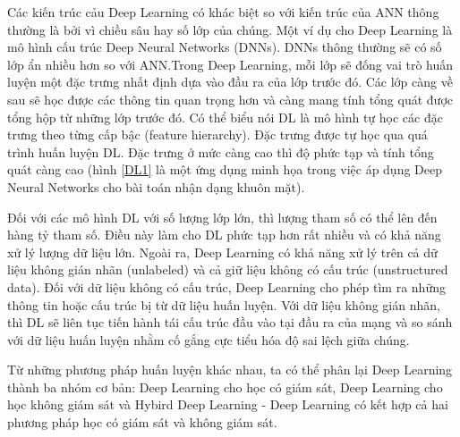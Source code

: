	Các kiến trúc cảu Deep Learning có khác biệt so với kiến trúc của ANN thông thường là bởi vì chiều sâu hay số lớp của chúng. Một ví dụ cho Deep Learning là mô hình cấu trúc Deep Neural Networks (DNNs). DNNs thông thường sẽ có số lớp ẩn nhiều hơn so với ANN.Trong Deep Learning, mỗi lớp sẽ đống vai trò huấn luyện một đặc trưng nhất định dựa vào đầu ra của lớp trước đó. Các lớp càng về sau sẽ học được các thông tin quan trọng hơn và càng mang tính tổng quát được tổng hộp từ những lớp trước đó. Có thể biểu nói DL là mô hình tự học các đặc trưng theo từng cấp bậc (feature hierarchy). Đặc trưng được tự học qua quá trình huấn luyện DL. Đặc trưng ở mức càng cao thì độ phức tạp và tính tổng quát càng cao (hình \ref{DL1} là một ứng dụng minh họa trong việc áp dụng Deep Neural Networks cho bài toán nhận dạng khuôn mặt). \par

	Đối với các mô hình DL với số lượng lớp lớn, thì lượng tham số có thể lên đến hàng tỷ tham số. Điều này làm cho DL phức tạp hơn rất nhiều và có khả năng xử lý lượng dữ liệu lớn. Ngoài ra, Deep Learning có khả năng xử lý trên cả dữ liệu không gián nhãn (unlabeled) và cả giữ liệu không có cấu trúc (unstructured data). Đối với dữ liệu không có cấu trúc, Deep Learning cho phép tìm ra những thông tin hoặc cấu trúc bị từ dữ liệu huấn luyện. Với dữ liệu không gián nhãn, thì DL sẽ liên tục tiến hành tái cấu trúc đầu vào tại đầu ra của mạng và so sánh với dữ liệu huấn luyện nhằm cố gắng cực tiểu hóa độ sai lệch giữa chúng. \par   
	 Từ những phương pháp huấn luyện khác nhau, ta có thể phân lại Deep Learning thành ba nhóm cơ bản: Deep Learning cho học có giám sát, Deep Learning cho học không giám sát và Hybird Deep Learning - Deep Learning có kết hợp cả hai phương pháp học có giám sát và không giám sát. \par
	 
